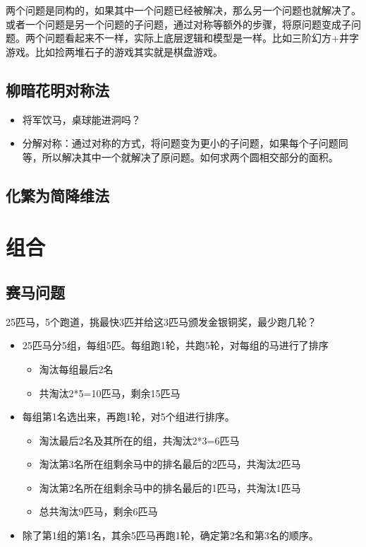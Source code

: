 \documentclass[12pt, letterpaper]{ctexrep}
\begin{document}
两个问题是同构的，如果其中一个问题已经被解决，那么另一个问题也就解决了。或者一个问题是另一个问题的子问题，通过对称等额外的步骤，将原问题变成子问题。两个问题看起来不一样，实际上底层逻辑和模型是一样。比如三阶幻方+井字游戏。比如捡两堆石子的游戏其实就是棋盘游戏。


\section{柳暗花明对称法}

\begin{itemize}
\item{ 将军饮马，桌球能进洞吗？ }
\item{ 分解对称：通过对称的方式，将问题变为更小的子问题，如果每个子问题同等，所以解决其中一个就解决了原问题。如何求两个圆相交部分的面积。 }
\end{itemize}



\section{化繁为简降维法}




\chapter{组合}


\section{赛马问题}
25匹马，5个跑道，挑最快3匹并给这3匹马颁发金银铜奖，最少跑几轮？


\begin{itemize}
\item{ 25匹马分5组，每组5匹。每组跑1轮，共跑5轮，对每组的马进行了排序
\begin{itemize}
\item{ 淘汰每组最后2名 }
\item{ 共淘汰2*5=10匹马，剩余15匹马 }
\end{itemize}
 }
\item{ 每组第1名选出来，再跑1轮，对5个组进行排序。
\begin{itemize}
\item{ 淘汰最后2名及其所在的组，共淘汰2*3=6匹马 }
\item{ 淘汰第3名所在组剩余马中的排名最后的2匹马，共淘汰2匹马 }
\item{ 淘汰第2名所在组剩余马中的排名最后的1匹马，共淘汰1匹马 }
\item{ 总共淘汰9匹马，剩余6匹马 }
\end{itemize}
 }
\item{ 除了第1组的第1名，其余5匹马再跑1轮，确定第2名和第3名的顺序。 }
\end{itemize}
\end{document}
